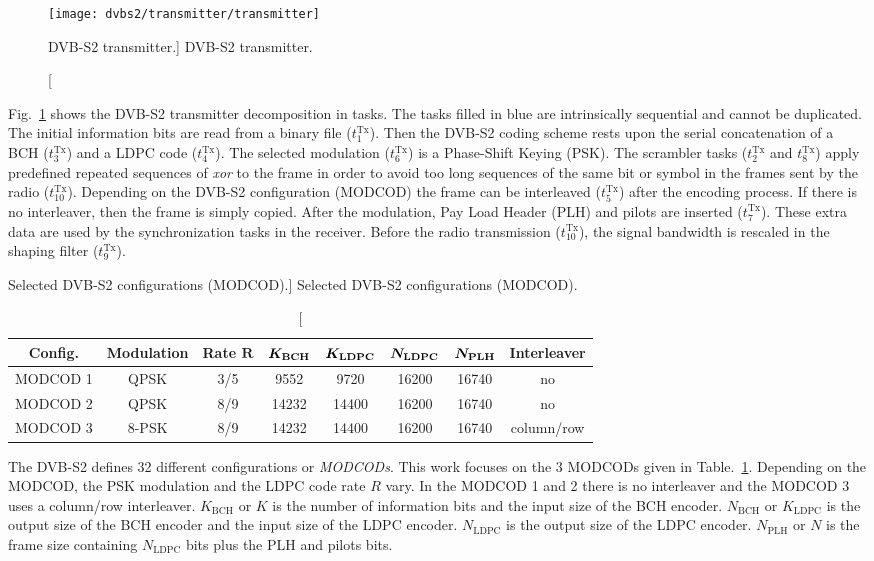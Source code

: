 \begin{figure}[htp]
  \centering
  \texttt{[image: dvbs2/transmitter/transmitter]}
  \caption
    [DVB-S2 transmitter.]
    {DVB-S2 transmitter.}
  \label{fig:dvbs2_transmitter}
\end{figure}

Fig.~\ref{fig:dvbs2_transmitter} shows the DVB-S2 transmitter decomposition in
tasks. The tasks filled in blue are intrinsically sequential and cannot be
duplicated. The initial information bits are read from a binary file
($t^\text{Tx}_1$). Then the DVB-S2 coding scheme rests upon the serial
concatenation of a BCH ($t^\text{Tx}_3$) and a LDPC code ($t^\text{Tx}_4$). The
selected modulation ($t^\text{Tx}_6$) is a Phase-Shift Keying (PSK). The
scrambler tasks ($t^\text{Tx}_2$ and $t^\text{Tx}_8$) apply predefined repeated
sequences of \emph{xor} to the frame in order to avoid too long sequences of the
same bit or symbol in the frames sent by the radio ($t^\text{Tx}_{10}$).
Depending on the DVB-S2 configuration (MODCOD) the frame can be interleaved
($t^\text{Tx}_5$) after the encoding process. If there is no interleaver, then
the frame is simply copied. After the modulation, Pay Load Header (PLH) and
pilots are inserted ($t^\text{Tx}_7$). These extra data are used by the
synchronization tasks in the receiver. Before the radio transmission
($t^\text{Tx}_{10}$), the signal bandwidth is rescaled in the shaping filter
($t^\text{Tx}_9$).

\begin{table}[htp]
  \centering
  \caption
    [Selected DVB-S2 configurations (MODCOD).]
    {Selected DVB-S2 configurations (MODCOD).}
  \label{tab:dvbs2_modcod}
  \begin{tabular}{c c c c c c c c}
    \textbf{Config.} & \textbf{Modulation} & \textbf{Rate} $\bm{R}$ & $\bm{K_\text{\textbf{BCH}}}$ & $\bm{K_\text{\textbf{LDPC}}}$ & $\bm{N_\text{\textbf{LDPC}}}$ & $\bm{N_\text{\textbf{PLH}}}$ & \textbf{Interleaver}\\
    \hline \hline
    MODCOD 1 &  QPSK & 3/5 &  9552 &  9720 & 16200 & 16740 & no\\
    MODCOD 2 &  QPSK & 8/9 & 14232 & 14400 & 16200 & 16740 & no\\
    MODCOD 3 & 8-PSK & 8/9 & 14232 & 14400 & 16200 & 16740 & column/row\\
  \end{tabular}
\end{table}

The DVB-S2 defines 32 different configurations or \emph{MODCODs}. This work
focuses on the 3 MODCODs given in Table.~\ref{tab:dvbs2_modcod}. Depending on
the MODCOD, the PSK modulation and the LDPC code rate $R$ vary. In the MODCOD 1
and 2 there is no interleaver and the MODCOD 3 uses a column/row interleaver.
$K_\text{BCH}$ or $K$ is the number of information bits and the input size of
the BCH encoder. $N_\text{BCH}$ or $K_\text{LDPC}$ is the output size of the
BCH encoder and the input size of the LDPC encoder. $N_\text{LDPC}$ is the
output size of the LDPC encoder. $N_\text{PLH}$ or $N$ is the frame size
containing $N_\text{LDPC}$ bits plus the PLH and pilots bits.

